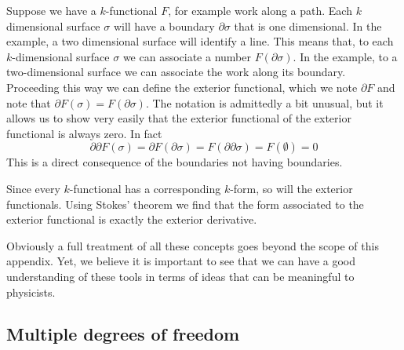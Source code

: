\documentclass[10pt,twocolumn, nofootinbib]{revtex4-2}
\begin{document}
Suppose we have a $k$-functional $F$, for example work along a path. Each $k$ dimensional surface $\sigma$ will have a boundary $\partial \sigma$ that is one dimensional. In the example, a two dimensional surface will identify a line. This means that, to each $k$-dimensional surface $\sigma$ we can associate a number $F(\partial \sigma)$. In the example, to a two-dimensional surface we can associate the work along its boundary. Proceeding this way we can define the exterior functional, which we note $\partial F$ and note that $\partial F(\sigma) = F(\partial \sigma)$. The notation is admittedly a bit unusual, but it allows us to show very easily that the exterior functional of the exterior functional is always zero. In fact
\begin{equation*}
	\partial \partial F(\sigma) = \partial F(\partial \sigma) = F(\partial \partial \sigma) = F(\emptyset) = 0
\end{equation*}
This is a direct consequence of the boundaries not having boundaries.

Since every $k$-functional has a corresponding $k$-form, so will the exterior functionals. Using Stokes' theorem we find that the form associated to the exterior functional is exactly the exterior derivative.

Obviously a full treatment of all these concepts goes beyond the scope of this appendix. Yet, we believe it is important to see that we can have a good understanding of these tools in terms of ideas that can be meaningful to physicists. 

\fi

\subsection*{Multiple degrees of freedom}
\end{document}
